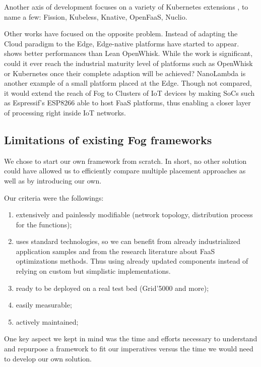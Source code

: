 Another axis of development focuses on a variety of Kubernetes extensions \cite{bocci_secure_2021}, to name a few: Fission, Kubeless, Knative, OpenFaaS, Nuclio.

Other works have focused on the opposite problem. Instead of adapting the Cloud paradigm to the Edge, Edge-native platforms have started to appear. \citet{pfandzelter_tinyfaas_2020} shows better performances than Lean OpenWhisk. While the work is significant, could it ever reach the industrial maturity level of platforms such as OpenWhisk or Kubernetes once their complete adaption will be achieved?  NanoLambda is another example of a small platform placed at the Edge. Though not compared, it would extend the reach of Fog to Clusters of IoT devices by making \glspl{SoC} such as Espressif's ESP8266 \cite{noauthor_esp8266_nodate} able to host \gls{FaaS} platforms, thus enabling a closer layer of processing right inside \gls{IoT} networks.

\subsection{Limitations of existing Fog frameworks}
\label{sec:limitations}

We chose to start our own framework from scratch. In short, no other solution could have allowed us to efficiently compare multiple placement approaches as well as by introducing our own.

Our criteria were the followings:
\begin{enumerate}[(1)]
	\item extensively and painlessly modifiable (network topology, distribution process for the functions);
	\item uses standard technologies, so we can benefit from already industrialized application samples and from the research literature about \gls{FaaS} optimizations methods. Thus using already updated components instead of relying on custom but simplistic implementations.
	\item ready to be deployed on a real test bed (Grid'5000 and more);
	\item easily measurable;
	\item actively maintained;
\end{enumerate}

One key aspect we kept in mind was the time and efforts necessary to understand and repurpose a framework to fit our imperatives versus the time we would need to develop our own solution.

